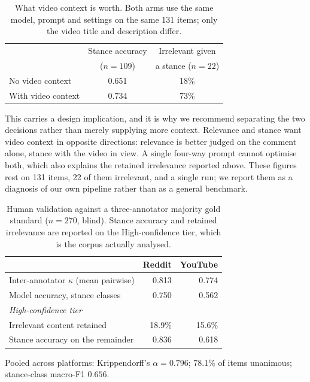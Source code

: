\begin{table}[t]
  \centering
  \small
  \caption{What video context is worth. Both arms use the same model, prompt and
  settings on the same 131 items; only the video title and description differ.}
  \label{tab:context}
  \setlength{\tabcolsep}{4pt}
  \begin{tabular}{@{}lcc@{}}
    \toprule
    & Stance accuracy & Irrelevant given \\
    & ($n=109$) & a stance ($n=22$) \\
    \midrule
    No video context   & 0.651 & 18\% \\
    With video context & 0.734 & 73\% \\
    \bottomrule
  \end{tabular}
\end{table}

This carries a design implication, and it is why we recommend separating the two
decisions rather than merely supplying more context. Relevance and stance want
video context in opposite directions: relevance is better judged on the comment
alone, stance with the video in view. A single four-way prompt cannot optimise
both, which also explains the retained irrelevance reported above. These figures
rest on 131 items, 22 of them irrelevant, and a single run; we report them as a
diagnosis of our own pipeline rather than as a general benchmark.

\begin{table}[t]
  \centering
  \small
  \caption{Human validation against a three-annotator majority gold standard
  ($n=270$, blind). Stance accuracy and retained irrelevance are reported on the
  High-confidence tier, which is the corpus actually analysed.}
  \label{tab:human}
  \begin{tabular}{lrr}
    \toprule
     & Reddit & YouTube \\
    \midrule
    Inter-annotator $\kappa$ (mean pairwise) & 0.813  & 0.774  \\
    Model accuracy, stance classes           & 0.750  & 0.562  \\
    \midrule
    \multicolumn{3}{l}{\emph{High-confidence tier}} \\
    Irrelevant content retained              & 18.9\% & 15.6\% \\
    Stance accuracy on the remainder         & 0.836  & 0.618  \\
    \bottomrule
  \end{tabular}
  \vspace{2pt}
  \footnotesize Pooled across platforms: Krippendorff's $\alpha = 0.796$;
  78.1\% of items unanimous; stance-class macro-F1 $0.656$.
\end{table}


